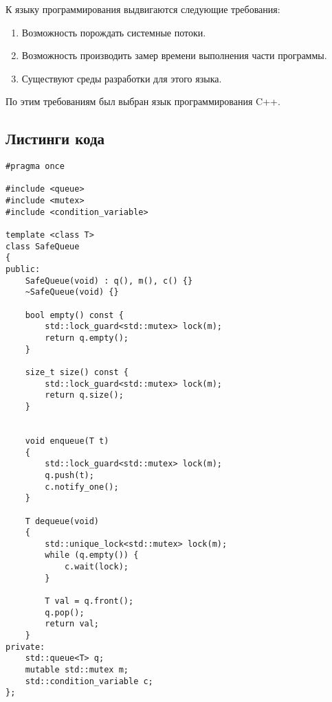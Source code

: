 К языку программирования выдвигаются следующие требования:

\begin{enumerate}
    \item Возможность порождать системные потоки.
    \item Возможность производить замер времени выполнения части программы.
    \item Существуют среды разработки для этого языка.
\end{enumerate}

По этим требованиям был выбран язык программирования C++.

\subsection{Листинги кода}

\begin{lstlisting}[caption=Реализация очереди, label=list:queue, language={}]
#pragma once

#include <queue>
#include <mutex>
#include <condition_variable>

template <class T>
class SafeQueue
{
public:
    SafeQueue(void) : q(), m(), c() {}
    ~SafeQueue(void) {}

    bool empty() const {
        std::lock_guard<std::mutex> lock(m);
        return q.empty();
    }

    size_t size() const {
        std::lock_guard<std::mutex> lock(m);
        return q.size();
    }
    

    void enqueue(T t)
    {
        std::lock_guard<std::mutex> lock(m);
        q.push(t);
        c.notify_one();
    }

    T dequeue(void)
    {
        std::unique_lock<std::mutex> lock(m);
        while (q.empty()) {
            c.wait(lock);
        }

        T val = q.front();
        q.pop();
        return val;
    }
private:
    std::queue<T> q;
    mutable std::mutex m;
    std::condition_variable c;
};	
\end{lstlisting}


